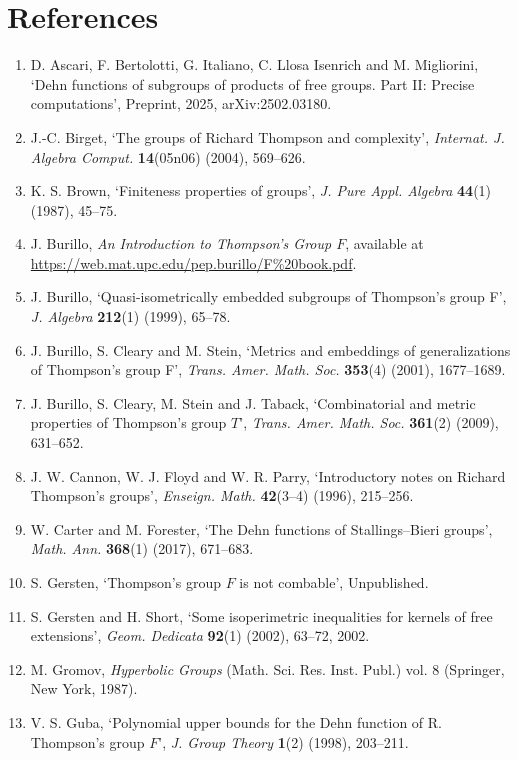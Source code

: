 \section*{References}
\begin{enumerate}
\renewcommand{\labelenumi}{[\arabic{enumi}]}
\item D. Ascari, F. Bertolotti, G. Italiano, C. Llosa Isenrich and M. Migliorini, `Dehn functions of subgroups of products of free groups. Part II: Precise computations', Preprint, 2025, arXiv:2502.03180.
\item J.-C. Birget, `The groups of Richard Thompson and complexity', \emph{Internat. J. Algebra Comput.} \textbf{14}(05n06) (2004), 569--626.
\item K. S. Brown, `Finiteness properties of groups', \emph{J. Pure Appl. Algebra} \textbf{44}(1) (1987), 45--75.
\item J. Burillo, \emph{An Introduction to Thompson's Group $F$}, available at \url{https://web.mat.upc.edu/pep.burillo/F%20book.pdf}.
\item J. Burillo, `Quasi-isometrically embedded subgroups of Thompson's group F', \emph{J. Algebra} \textbf{212}(1) (1999), 65--78.
\item J. Burillo, S. Cleary and M. Stein, `Metrics and embeddings of generalizations of Thompson's group F', \emph{Trans. Amer. Math. Soc.} \textbf{353}(4) (2001), 1677--1689.
\item J. Burillo, S. Cleary, M. Stein and J. Taback, `Combinatorial and metric properties of Thompson's group $T$', \emph{Trans. Amer. Math. Soc.} \textbf{361}(2) (2009), 631--652.
\item J. W. Cannon, W. J. Floyd and W. R. Parry, `Introductory notes on Richard Thompson's groups', \emph{Enseign. Math.} \textbf{42}(3--4) (1996), 215--256.
\item W. Carter and M. Forester, `The Dehn functions of Stallings--Bieri groups', \emph{Math. Ann.} \textbf{368}(1) (2017), 671--683.
\item S. Gersten, `Thompson's group $F$ is not combable', Unpublished.
\item S. Gersten and H. Short, `Some isoperimetric inequalities for kernels of free extensions', \emph{Geom. Dedicata} \textbf{92}(1) (2002), 63--72, 2002.
\item M. Gromov, \emph{Hyperbolic Groups} (Math. Sci. Res. Inst. Publ.) vol. 8 (Springer, New York, 1987).
\item V. S. Guba, `Polynomial upper bounds for the Dehn function of R. Thompson's group $F$', \emph{J. Group Theory} \textbf{1}(2) (1998), 203--211.

\end{enumerate}
